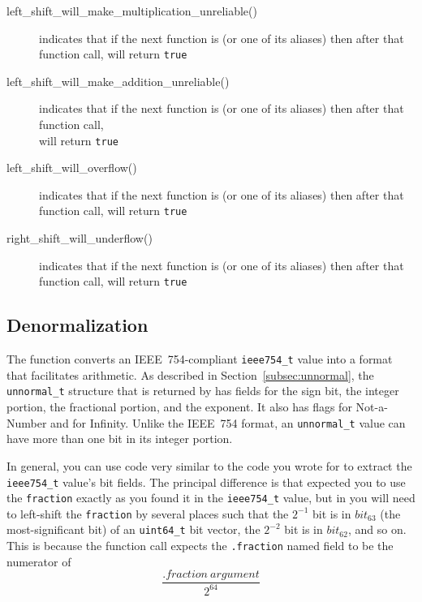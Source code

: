 \begin{itemize}
\begin{description}
        \item[left\_shift\_will\_make\_multiplication\_unreliable()] indicates that if the next function is  (or one of its aliases) then after that function call,  will return \lstinline{true}
        \item[left\_shift\_will\_make\_addition\_unreliable()] indicates that if the next function is  (or one of its aliases) then after that function call, \\  will return \lstinline{true}
        \item[left\_shift\_will\_overflow()] indicates that if the next function is  (or one of its aliases) then after that function call,  will return \lstinline{true}
        \item[right\_shift\_will\_underflow()] indicates that if the next function is  (or one of its aliases) then after that function call,  will return \lstinline{true}
    \end{description}
\end{itemize}

\subsection{Denormalization}

The  function converts an IEEE~754-compliant \lstinline{ieee754_t} value into a format that facilitates arithmetic.
As described in Section~\ref{subsec:unnormal}, the \lstinline{unnormal_t} structure that is returned by  has fields for the sign bit, the integer portion, the fractional portion, and the exponent.
It also has flags for Not-a-Number and for Infinity.
Unlike the IEEE~754 format, an \lstinline{unnormal_t} value can have more than one bit in its integer portion.

In general, you can use code very similar to the code you wrote for  to extract the \lstinline{ieee754_t} value's bit fields.
The principal difference is that  expected you to use the \lstinline{fraction} exactly as you found it in the \lstinline{ieee754_t} value,
but in  you will need to left-shift the \lstinline{fraction} by several places such that the $2^{-1}$ bit is in $bit_{63}$ (the most-significant bit) of an \lstinline{uint64_t} bit vector, the $2^{-2}$ bit is in $bit_{62}$, and so on.
This is because the  function call expects the \lstinline{.fraction} named field to be the numerator of
\[\frac{.fraction\ argument}{2^{64}}\]

